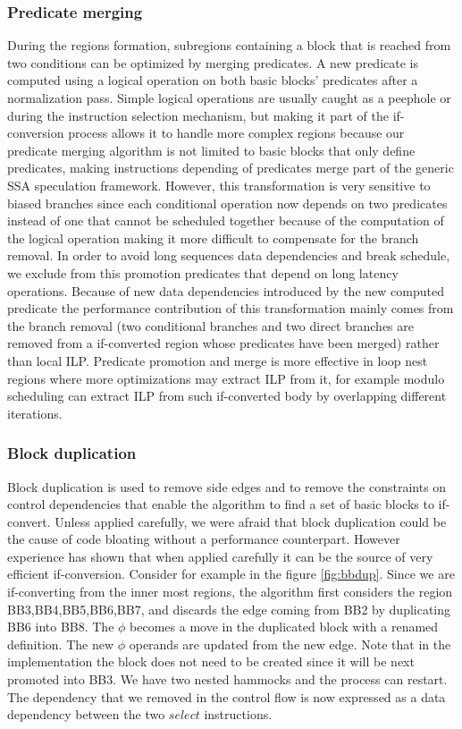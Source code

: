 \subsubsection{Predicate merging}

During the regions formation, subregions containing a block that is reached from two conditions can be optimized by merging predicates. A new predicate is computed using a logical operation on both basic blocks' predicates after a normalization pass. Simple logical operations are usually caught as a peephole or during the instruction selection mechanism, but making it part of the if-conversion process allows it to handle more complex regions because our predicate merging algorithm is not limited to basic blocks that only define predicates, making instructions depending of predicates merge part of the generic SSA speculation framework. However, this transformation is very sensitive to biased branches since each conditional operation now depends on two predicates instead of one that cannot be scheduled together because of the computation of the logical operation making it more difficult to compensate for the branch removal. In order to avoid long sequences data dependencies and break schedule, we exclude from this promotion predicates that depend on long latency operations.
Because of new data dependencies introduced by the new computed predicate the performance contribution of this transformation mainly comes from the branch removal (two conditional branches and two direct branches are removed from a if-converted region whose predicates have been merged) rather than local ILP. Predicate promotion and merge is more effective in loop nest regions where more optimizations may extract ILP from it, for example modulo scheduling can extract ILP from such if-converted body by overlapping different iterations. 

\subsubsection{Block duplication}

Block duplication is used to remove side edges and to remove the constraints on control dependencies that enable the algorithm to find a set of basic blocks to if-convert. Unless applied carefully, we were afraid that block duplication could be the cause of code bloating without a performance counterpart. However experience has shown that when applied carefully it can be the source of very efficient if-conversion. Consider for example in the figure \ref{fig:bbdup}. Since we are if-converting from the inner most regions, the algorithm first considers the region {BB3,BB4,BB5,BB6,BB7}, and discards the edge coming from BB2 by duplicating BB6 into BB8. The $\phi$ becomes a move in the duplicated block with a renamed definition. The new $\phi$ operands are updated from the new edge. Note that in the implementation the block does not need to be created since it will be next promoted into BB3. We have two nested hammocks and the process can restart. The dependency that we removed in the control flow is now expressed as a data dependency between the two $select$ instructions.

